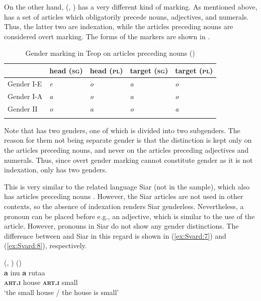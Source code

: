 \documentclass[output=collectionpaper]{langsci/langscibook}
\begin{document}
On the other hand,  (, ) has a very different kind of marking. As mentioned above,  has a set of articles which obligatorily precede nouns, adjectives, and numerals. Thus, the latter two are indexation, while the articles preceding nouns are considered overt marking. The forms of the markers are shown in .


\begin{table}
\begin{tabular}{lllll}
\lsptoprule
& head (\textsc{sg}) & head \textsc{(pl)} & target \textsc{(sg)} & target \textsc{(pl)}\\
\midrule
Gender I-E & \itshape e & \itshape o & \itshape a & \itshape o\\
Gender I-A & \itshape a & \itshape o & \itshape a & \itshape o\\
Gender II & \itshape o & \itshape a & \itshape o & \itshape a\\
\lspbottomrule
\end{tabular}
\caption{Gender marking in Teop on articles preceding nouns (\citealt[322]{Mosel2000})}
\label{tab:Svard:12}
\end{table}


Note that  has two genders, one of which is divided into two subgenders. The reason for them not being separate gender is that the distinction is kept only on the articles preceding nouns, and never on the articles preceding adjectives and numerals. Thus, since overt gender marking cannot constitute gender as it is not indexation,  only has two genders.


This is very similar to the related  language Siar (not in the sample), which also has articles preceding nouns \citep{Frowein2011}. However, the Siar articles are not used in other contexts, so the absence of indexation renders Siar genderless. Nevertheless, a pronoun can be placed before e.g., an adjective, which is similar to the use of the  article. However, pronouns in Siar do not show any gender distinctions. The difference between  and Siar in this regard is shown in (\ref{ex:Svard:7}) and (\ref{ex:Svard:8}), respectively.


\ea
\label{ex:Svard:7}
 (, ) (\citealt[326]{Mosel2000})\\
\gll \textbf{a} inu \textbf{a} rutaa\\
     \textsc{\textbf{art.i}} house \textsc{\textbf{art.i}} small\\
\glt `the small house / the house is small'
\z
\end{document}

